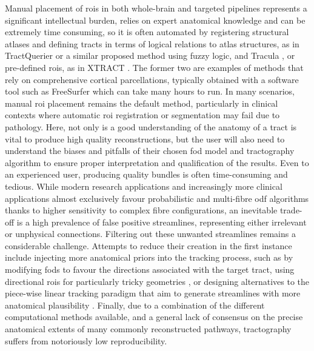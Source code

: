 Manual placement of \glspl{roi} in both whole-brain and targeted pipelines represents a significant intellectual burden, relies on expert anatomical knowledge and can be extremely time consuming, so it is often automated by registering structural atlases and defining tracts in terms of logical relations to atlas structures, as in TractQuerier\autocite{Wassermann2016} or a similar proposed method using fuzzy logic\autocite{Delmonte2019}, and Tracula \autocite{Yendiki2011}, or pre-defined \glspl{roi}, as in XTRACT \autocite{Warrington2020}.
The former two are examples of methods that rely on comprehensive cortical parcellations, typically obtained with a software tool such as FreeSurfer which can take many hours to run.
In many scenarios, manual \gls{roi} placement remains the default method, particularly in clinical contexts where automatic \gls{roi} registration or segmentation may fail due to pathology.
Here, not only is a good understanding of the anatomy of a tract is vital to produce high quality reconstructions, but the user will also need to understand the biases and pitfalls of their chosen \gls{fod} model and tractography algorithm to ensure proper interpretation and qualification of the results\autocite{Rheault2020,Rheault2022}.
Even to an experienced user, producing quality bundles is often time-consuming and tedious.
While modern research applications and increasingly more clinical applications almost exclusively favour probabilistic and multi-fibre \gls{odf} algorithms thanks to higher sensitivity to complex fibre configurations\autocite{Yang2021}, an inevitable trade-off is a high prevalence of false positive streamlines, representing either irrelevant or unphysical connections.
Filtering out these unwanted streamlines remains a considerable challenge\autocite{Jorgens2021}.
Attempts to reduce their creation in the first instance include injecting more anatomical priors into the tracking process, such as by modifying \glspl{fod} to favour the directions associated with the target tract\autocite{Rheault2019}, using directional \glspl{roi} for particularly tricky geometries \autocite{Chamberland2017}, or designing alternatives to the piece-wise linear tracking paradigm that aim to generate streamlines with more anatomical plausibility \autocite{Schomburg2017,Aydogan2021}.
Finally, due to a combination of the different computational methods available, and a general lack of consensus on the precise anatomical extents of many commonly reconstructed pathways, tractography suffers from notoriously low reproducibility\autocite{Schilling2021a}.

